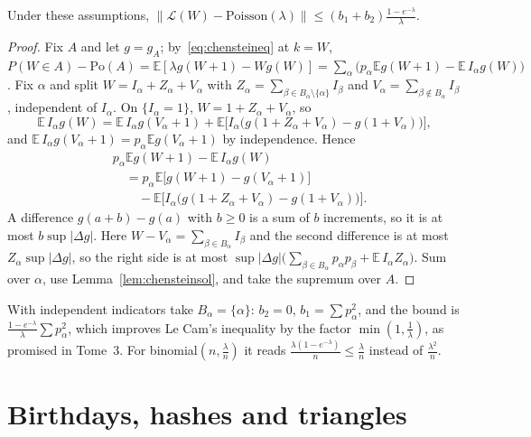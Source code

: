 \begin{theorem}\label{thm:chenstein}
Under these assumptions, $\displaystyle\|\mathcal L(W)-\text{Poisson}(\lambda)\|\le(b_1+b_2)\frac{1-e^{-\lambda}}\lambda$.
\end{theorem}
\begin{proof}
Fix $A$ and let $g=g_A$; by~\eqref{eq:chensteineq} at $k=W$, $P(W\in A)-\mathrm{Po}(A)=\mathbb E[\lambda g(W+1)-Wg(W)]=\sum_\alpha\bigl(p_\alpha\mathbb Eg(W+1)-\mathbb E\,I_\alpha g(W)\bigr)$.
Fix $\alpha$ and split $W=I_\alpha+Z_\alpha+V_\alpha$ with $Z_\alpha=\sum_{\beta\in B_\alpha\setminus\{\alpha\}}I_\beta$ and $V_\alpha=\sum_{\beta\notin B_\alpha}I_\beta$, independent of $I_\alpha$.
On $\{I_\alpha=1\}$, $W=1+Z_\alpha+V_\alpha$, so
\[
\mathbb E\,I_\alpha g(W)=\mathbb E\,I_\alpha g(V_\alpha+1)+\mathbb E\bigl[I_\alpha\bigl(g(1+Z_\alpha+V_\alpha)-g(1+V_\alpha)\bigr)\bigr],
\]
and $\mathbb E\,I_\alpha g(V_\alpha+1)=p_\alpha\mathbb Eg(V_\alpha+1)$ by independence. Hence
\[
\begin{aligned}
&p_\alpha\mathbb Eg(W+1)-\mathbb E\,I_\alpha g(W)\\
&\quad=p_\alpha\mathbb E\bigl[g(W+1)-g(V_\alpha+1)\bigr]\\
&\qquad-\mathbb E\bigl[I_\alpha\bigl(g(1+Z_\alpha+V_\alpha)-g(1+V_\alpha)\bigr)\bigr].
\end{aligned}
\]
A difference $g(a+b)-g(a)$ with $b\ge0$ is a sum of $b$ increments, so it is at most $b\sup|\Delta g|$. Here $W-V_\alpha=\sum_{\beta\in B_\alpha}I_\beta$ and the second
difference is at most $Z_\alpha\sup|\Delta g|$, so the right side is at most $\sup|\Delta g|\bigl(\sum_{\beta\in B_\alpha}p_\alpha p_\beta+\mathbb E\,I_\alpha Z_\alpha\bigr)$.
Sum over $\alpha$, use Lemma~\ref{lem:chensteinsol}, and take the supremum over $A$.
\end{proof}

With independent indicators take $B_\alpha=\{\alpha\}$: $b_2=0$, $b_1=\sum p_\alpha^2$, and the bound is $\frac{1-e^{-\lambda}}\lambda\sum p_\alpha^2$, which improves Le Cam's
inequality by the factor $\min(1,\frac1\lambda)$, as promised in Tome~3. For binomial$(n,\frac\lambda n)$ it reads $\frac{\lambda(1-e^{-\lambda})}n\le\frac\lambda n$ instead of $\frac{\lambda^2}n$.

\section{Birthdays, hashes and triangles}

